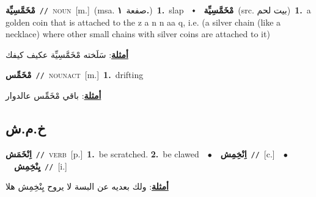 \documentclass[10pt,a4paper,twoside]{article} %
\begin{document}
\begin{multicols}{2}
{\setlength\topsep{0pt}\textbf{\foreignlanguage{arabic}{مْخَمَّسِيِّة}}\ {\color{gray}\texttt{//}\color{black}}\ \textsc{noun}\ [m.]\ \color{gray}(msa. \foreignlanguage{arabic}{صفعة}~\foreignlanguage{arabic}{\textbf{١.}})\color{black}\ \textbf{1.}~slap\ \ $\smblkdiamond$\ \ \setlength\topsep{0pt}\textbf{\foreignlanguage{arabic}{مْخَمَّسِيِّة}}\ (src. \color{gray}\foreignlanguage{arabic}{بيت لحم}\color{black})\ \textbf{1.}~a golden coin that is attached to the z a n n aa q, i.e. (a silver chain (like a necklace) where other small chains with silver coins are attached to it)\  \begin{flushright}\color{gray}\foreignlanguage{arabic}{\textbf{\underline{\foreignlanguage{arabic}{أمثلة}}}: سَلَخته مْخَمَّسِيِّة عكيف كيفك}\end{flushright}\color{black}} \vspace{2mm}

{\setlength\topsep{0pt}\textbf{\foreignlanguage{arabic}{مْخَمِّس}}\ {\color{gray}\texttt{//}\color{black}}\ \textsc{noun\textunderscore act}\ [m.]\ \textbf{1.}~drifting\  \begin{flushright}\color{gray}\foreignlanguage{arabic}{\textbf{\underline{\foreignlanguage{arabic}{أمثلة}}}: باقي مْخَمِّس عالدوار}\end{flushright}\color{black}} \vspace{2mm}

\vspace{-3mm}
\subsection*{\color{blue}\foreignlanguage{arabic}{خ.م.ش}\color{blue}{}} 

{\setlength\topsep{0pt}\textbf{\foreignlanguage{arabic}{اِنْخَمَش}}\ {\color{gray}\texttt{//}\color{black}}\ \textsc{verb}\ [p.]\ \textbf{1.}~be scratched.  \textbf{2.}~be clawed\ \ $\bullet$\ \ \setlength\topsep{0pt}\textbf{\foreignlanguage{arabic}{اِنْخِمِش}}\ {\color{gray}\texttt{//}\color{black}}\ [c.]\ \ $\bullet$\ \ \setlength\topsep{0pt}\textbf{\foreignlanguage{arabic}{يِنْخِمِش}}\ {\color{gray}\texttt{//}\color{black}}\ [i.]\  \begin{flushright}\color{gray}\foreignlanguage{arabic}{\textbf{\underline{\foreignlanguage{arabic}{أمثلة}}}: ولك بعديه عن البسة لا يروح يِنْخِمِش هلا}\end{flushright}\color{black}} \vspace{2mm}


\end{multicols}
\end{document}
